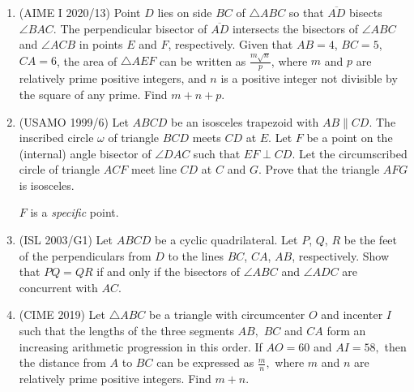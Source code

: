 \begin{enumerate}
    \item (AIME I 2020/13) Point $D$ lies on side $BC$ of $\triangle ABC$ so that $\overline{AD}$ bisects $\angle BAC$. The perpendicular bisector of $\overline{AD}$ intersects the bisectors of $\angle ABC$ and $\angle ACB$ in points $E$ and $F$, respectively. Given that $AB=4$, $BC=5$, $CA=6$, the area of $\triangle AEF$ can be written as $\tfrac{m\sqrt n}p$, where $m$ and $p$ are relatively prime positive integers, and $n$ is a positive integer not divisible by the square of any prime. Find $m+n+p$.
    
    \item (USAMO 1999/6) Let $ABCD$ be an isosceles trapezoid with $AB \parallel CD$. The inscribed circle $\omega$ of triangle $BCD$ meets $CD$ at $E$. Let $F$ be a point on the (internal) angle bisector of $\angle DAC$ such that $EF \perp CD$. Let the circumscribed circle of triangle $ACF$ meet line $CD$ at $C$ and $G$. Prove that the triangle $AFG$ is isosceles.
    \begin{hint}
    \begin{addhint}
    {$F$ is a \textit{specific} point.}
    \end{addhint}
    \end{hint}
    
    \item (ISL 2003/G1) Let $ABCD$ be a cyclic quadrilateral. Let $P$, $Q$, $R$ be the feet of the perpendiculars from $D$ to the lines $BC$, $CA$, $AB$, respectively. Show that $PQ=QR$ if and only if the bisectors of $\angle ABC$ and $\angle ADC$ are concurrent with $AC$.
    
    \item (CIME 2019) Let $\triangle ABC$ be a triangle with circumcenter $O$ and incenter $I$ such that the lengths of the three segments $AB,$ $BC$ and $CA$ form an increasing arithmetic progression in this order$.$ If $AO=60$ and $AI=58,$ then the distance from $A$ to $BC$ can be expressed as $\tfrac mn,$ where $m$ and $n$ are relatively prime positive integers$.$ Find $m+n.$
\end{enumerate}